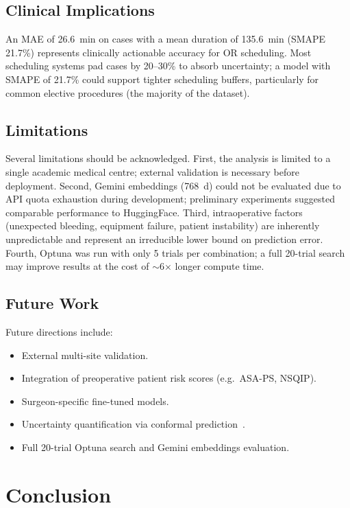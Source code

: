 \documentclass[11pt,twocolumn]{article}
\begin{document}
\subsection{Clinical Implications}
An MAE of 26.6~min on cases with a mean duration of 135.6~min (SMAPE 21.7\%)
represents clinically actionable accuracy for OR scheduling.  Most scheduling
systems pad cases by 20--30\% to absorb uncertainty; a model with SMAPE of 21.7\%
could support tighter scheduling buffers, particularly for common elective
procedures (the majority of the dataset).

\subsection{Limitations}
Several limitations should be acknowledged.  First, the analysis is limited to a
single academic medical centre; external validation is necessary before deployment.
Second, Gemini embeddings (768~d) could not be evaluated due to API quota
exhaustion during development; preliminary experiments suggested comparable
performance to HuggingFace.  Third, intraoperative factors (unexpected bleeding,
equipment failure, patient instability) are inherently unpredictable and represent
an irreducible lower bound on prediction error.  Fourth, Optuna was run with only
5 trials per combination; a full 20-trial search may improve results at the cost
of $\sim$6× longer compute time.

\subsection{Future Work}
Future directions include:
\begin{itemize}
  \item External multi-site validation.
  \item Integration of preoperative patient risk scores (e.g.\ ASA-PS, NSQIP).
  \item Surgeon-specific fine-tuned models.
  \item Uncertainty quantification via conformal prediction~\cite{vovk2005}.
  \item Full 20-trial Optuna search and Gemini embeddings evaluation.
\end{itemize}

\section{Conclusion}
\label{sec:conclusion}
\end{document}
